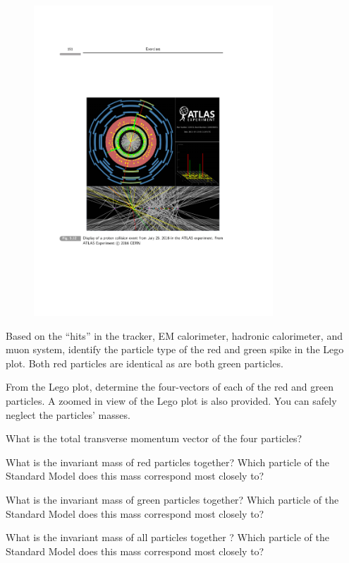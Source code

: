{\begin{itemize}
{\begin{figure}[h!]
\centering
\includegraphics[width=0.8\textwidth]{./EventDisplay.pdf}
\end{figure}

\item[d.]{ Based on the “hits” in the tracker, EM calorimeter, hadronic calorimeter, and muon system, identify the particle type of the red and green spike in the Lego plot. 
Both red particles are identical as are both green particles.}
\item[e.]{
From the Lego plot, determine the four-vectors of each of the red and green particles. 
A zoomed in view of the Lego plot is also provided. You can safely neglect the particles’ masses. 
}
\item[f.]{
What is the total transverse momentum vector of the four particles?
}
\item[h.]{What is the invariant mass of red particles together? Which particle of the Standard Model does this mass correspond most closely to?}
\item[i.]{What is the invariant mass of green particles together? Which particle of the Standard Model does this mass correspond most closely to?}
\item[j.]{What is the invariant mass of all particles together ? Which particle of the Standard Model does this mass correspond most closely to?}

}
\end{itemize}}
